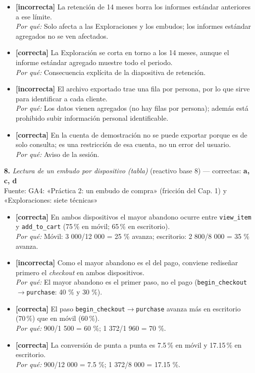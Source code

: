 \documentclass[10pt,letterpaper]{article}
\begin{document}
\begin{itemize}[leftmargin=1.2em,itemsep=0pt,topsep=1pt,parsep=0pt]
\item[\textbf{a)}] {\footnotesize \textbf{[incorrecta]} La retención de 14 meses borra los informes estándar anteriores a ese límite.\\ \textit{Por qué:} Solo afecta a las Exploraciones y los embudos; los informes estándar agregados no se ven afectados.}
\item[\textbf{b)}] {\footnotesize \textbf{[correcta]} La Exploración se corta en torno a los 14 meses, aunque el informe estándar agregado muestre todo el periodo.\\ \textit{Por qué:} Consecuencia explícita de la diapositiva de retención.}
\item[\textbf{c)}] {\footnotesize \textbf{[incorrecta]} El archivo exportado trae una fila por persona, por lo que sirve para identificar a cada cliente.\\ \textit{Por qué:} Los datos vienen agregados (no hay filas por persona); además está prohibido subir información personal identificable.}
\item[\textbf{d)}] {\footnotesize \textbf{[correcta]} En la cuenta de demostración no se puede exportar porque es de solo consulta; es una restricción de esa cuenta, no un error del usuario.\\ \textit{Por qué:} Aviso de la sesión.}
\end{itemize}
\vspace{3pt}\noindent\textbf{8.} \textit{Lectura de un embudo por dispositivo (tabla)} (reactivo base 8) — correctas: \textbf{a, c, d}\\[-1pt]
{\scriptsize Fuente: GA4: «Práctica 2: un embudo de compra» (fricción del Cap. 1) y «Exploraciones: siete técnicas»}
\begin{itemize}[leftmargin=1.2em,itemsep=0pt,topsep=1pt,parsep=0pt]
\item[\textbf{a)}] {\footnotesize \textbf{[correcta]} En ambos dispositivos el mayor abandono ocurre entre \texttt{view\_item} y \texttt{add\_to\_cart} (75\,\% en móvil; 65\,\% en escritorio).\\ \textit{Por qué:} Móvil: 3 000/12 000 = 25 \% avanza; escritorio: 2 800/8 000 = 35 \% avanza.}
\item[\textbf{b)}] {\footnotesize \textbf{[incorrecta]} Como el mayor abandono es el del pago, conviene rediseñar primero el \textit{checkout} en ambos dispositivos.\\ \textit{Por qué:} El mayor abandono es el primer paso, no el pago (\texttt{begin\_checkout}$\to$\texttt{purchase}: 40 \% y 30 \%).}
\item[\textbf{c)}] {\footnotesize \textbf{[correcta]} El paso \texttt{begin\_checkout}$\to$\texttt{purchase} avanza más en escritorio (70\,\%) que en móvil (60\,\%).\\ \textit{Por qué:} 900/1 500 = 60 \%; 1 372/1 960 = 70 \%.}
\item[\textbf{d)}] {\footnotesize \textbf{[correcta]} La conversión de punta a punta es 7.5\,\% en móvil y 17.15\,\% en escritorio.\\ \textit{Por qué:} 900/12 000 = 7.5 \%; 1 372/8 000 = 17.15 \%.}
\end{itemize}
\end{document}
